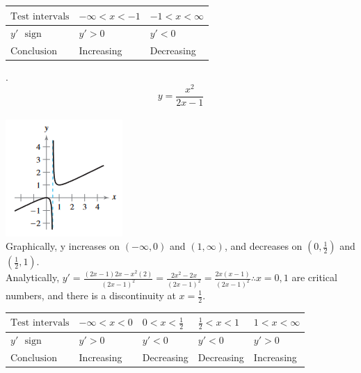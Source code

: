 \documentclass[11pt]{article}
\newcommand*{\next}{\noindent}
\begin{document}
\begin{flushleft}
    \begin{table}
        \begin{tabular}{|l|l|l|} %
        \hline
        $\text{Test intervals}$ & $-\infty<x<-1$ & $-1<x<\infty$\\ \hline
        $y'\,\,\,\,\text{sign}$ & $y'>0$ & $y'<0$ \\ \hline
        $\text{Conclusion}$ & Increasing & Decreasing\\
        \hline
        \end{tabular}
    \end{table}
\end{flushleft}

\next
8.\[y=\frac{x^2}{2x-1}\]\\
\includegraphics{8.png}\\
Graphically, y increases on $(-\infty, 0)$ and $(1, \infty)$, and decreases on $(0, \frac{1}{2})$ and $(\frac{1}{2}, 1)$.\\
Analytically, $y'=\frac{(2x-1)2x-x^2(2)}{(2x-1)^2}=\frac{2x^2-2x}{(2x-1)^2}=\frac{2x(x-1)}{(2x-1)^2}\therefore x=0, 1$ are critical numbers, and there is a discontinuity at $x=\frac{1}{2}$.
\begin{flushleft}
    \begin{table}[h]
        \begin{tabular}{|l|l|l|l|l|} %
        \hline
        $\text{Test intervals}$ & $-\infty<x<0$ & $0<x<\frac{1}{2}$ & $\frac{1}{2}<x<1$ & $1<x<\infty$\\ \hline
        $y'\,\,\,\,\text{sign}$ & $y'>0$ & $y'<0$ & $y'<0$ & $y'>0$\\ \hline
        $\text{Conclusion}$ & Increasing & Decreasing & Decreasing & Increasing\\
        \hline
        \end{tabular}
    \end{table}
\end{flushleft}
\end{document}
